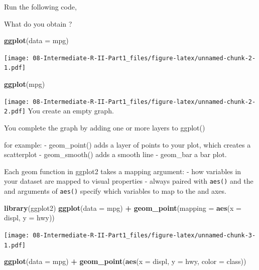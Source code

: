 \documentclass[
]{book}
\newenvironment{Shaded}{\begin{snugshade}}{\end{snugshade}}
\newcommand{\AttributeTok}[1]{\textcolor[rgb]{0.13,0.29,0.53}{#1}}
\newcommand{\FunctionTok}[1]{\textcolor[rgb]{0.13,0.29,0.53}{\textbf{#1}}}
\newcommand{\NormalTok}[1]{#1}
\newcommand{\SpecialCharTok}[1]{\textcolor[rgb]{0.81,0.36,0.00}{\textbf{#1}}}
\begin{document}
Run the following code,

What do you obtain ?

\begin{Shaded}
\begin{Highlighting}[]

\FunctionTok{ggplot}\NormalTok{(}\AttributeTok{data =}\NormalTok{ mpg)}
\end{Highlighting}
\end{Shaded}

\texttt{[image: 08-Intermediate-R-II-Part1\_files/figure-latex/unnamed-chunk-2-1.pdf]}

\begin{Shaded}
\begin{Highlighting}[]
\FunctionTok{ggplot}\NormalTok{(mpg)}
\end{Highlighting}
\end{Shaded}

\texttt{[image: 08-Intermediate-R-II-Part1\_files/figure-latex/unnamed-chunk-2-2.pdf]}
You create an empty graph.

You complete the graph by adding one or more layers to ggplot()

for example:
- geom\_point() adds a layer of points to your plot, which creates a scatterplot
- geom\_smooth() adds a smooth line
- geom\_bar a bar plot.

Each geom function in ggplot2 takes a mapping argument:
- how variables in your dataset are mapped to visual properties
- always paired with \texttt{aes()} and the and arguments of \texttt{aes()} specify which variables to map to the and axes.

\begin{Shaded}
\begin{Highlighting}[]
\FunctionTok{library}\NormalTok{(ggplot2)}
\FunctionTok{ggplot}\NormalTok{(}\AttributeTok{data =}\NormalTok{ mpg) }\SpecialCharTok{+} 
  \FunctionTok{geom\_point}\NormalTok{(}\AttributeTok{mapping =} \FunctionTok{aes}\NormalTok{(}\AttributeTok{x =}\NormalTok{ displ, }\AttributeTok{y =}\NormalTok{ hwy))}
\end{Highlighting}
\end{Shaded}

\texttt{[image: 08-Intermediate-R-II-Part1\_files/figure-latex/unnamed-chunk-3-1.pdf]}

\begin{Shaded}
\begin{Highlighting}[]
\FunctionTok{ggplot}\NormalTok{(}\AttributeTok{data =}\NormalTok{ mpg) }\SpecialCharTok{+} \FunctionTok{geom\_point}\NormalTok{(}\FunctionTok{aes}\NormalTok{(}\AttributeTok{x =}\NormalTok{ displ, }\AttributeTok{y =}\NormalTok{ hwy, }\AttributeTok{color =}\NormalTok{ class))}
\end{Highlighting}
\end{Shaded}
\end{document}
